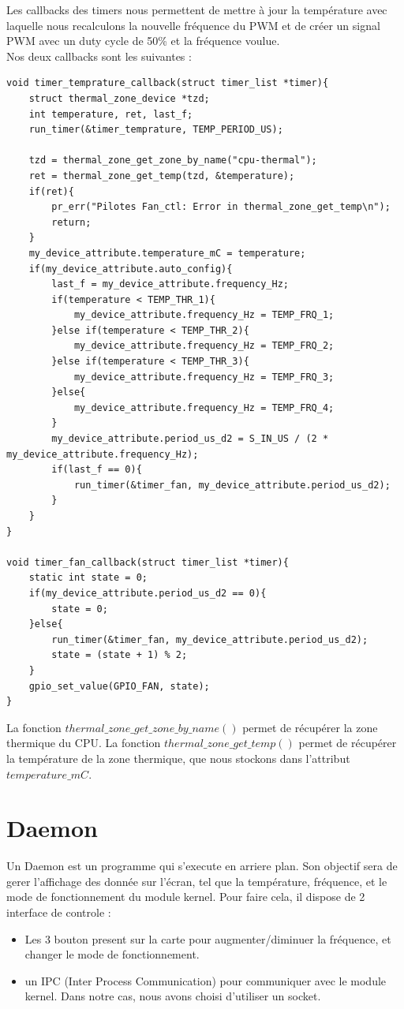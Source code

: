 \documentclass[
	a4paper, %
	10pt, %
]{CSUniSchoolLabReport}
\begin{document}
Les callbacks des timers nous permettent de mettre à jour la température avec laquelle nous recalculons la nouvelle fréquence du PWM et de créer un signal PWM avec un duty cycle de 50\% et la fréquence voulue. \\
Nos deux callbacks sont les suivantes :
\begin{lstlisting}[style=CStyle]
void timer_temprature_callback(struct timer_list *timer){
	struct thermal_zone_device *tzd;
	int temperature, ret, last_f;
	run_timer(&timer_temprature, TEMP_PERIOD_US);

	tzd = thermal_zone_get_zone_by_name("cpu-thermal");
	ret = thermal_zone_get_temp(tzd, &temperature);
	if(ret){
		pr_err("Pilotes Fan_ctl: Error in thermal_zone_get_temp\n");
		return;
	}
	my_device_attribute.temperature_mC = temperature;
	if(my_device_attribute.auto_config){
		last_f = my_device_attribute.frequency_Hz;
		if(temperature < TEMP_THR_1){
			my_device_attribute.frequency_Hz = TEMP_FRQ_1;
		}else if(temperature < TEMP_THR_2){
			my_device_attribute.frequency_Hz = TEMP_FRQ_2;
		}else if(temperature < TEMP_THR_3){
			my_device_attribute.frequency_Hz = TEMP_FRQ_3;
		}else{
			my_device_attribute.frequency_Hz = TEMP_FRQ_4;
		}
		my_device_attribute.period_us_d2 = S_IN_US / (2 * my_device_attribute.frequency_Hz);
		if(last_f == 0){
			run_timer(&timer_fan, my_device_attribute.period_us_d2);
		}
	}
}

void timer_fan_callback(struct timer_list *timer){
	static int state = 0;
	if(my_device_attribute.period_us_d2 == 0){
		state = 0;
	}else{
		run_timer(&timer_fan, my_device_attribute.period_us_d2);
		state = (state + 1) % 2;
	}
	gpio_set_value(GPIO_FAN, state);
}
\end{lstlisting}

La fonction $thermal\_zone\_get\_zone\_by\_name()$ permet de récupérer la zone thermique du CPU. La fonction $thermal\_zone\_get\_temp()$ permet de récupérer la température de la zone thermique, que nous stockons dans l'attribut $temperature\_mC$. \\

\section{Daemon}\label{Daemon}
Un Daemon est un programme qui s'execute en arriere plan. 
Son objectif sera de gerer l'affichage des donnée sur l'écran, tel que la température, fréquence, et le mode de fonctionnement du module kernel.
Pour faire cela, il dispose de 2 interface de controle : \\
\begin{itemize}
	\item Les 3 bouton present sur la carte pour augmenter/diminuer la fréquence, et changer le mode de fonctionnement.
	\item un IPC (Inter Process Communication) pour communiquer avec le module kernel. Dans notre cas, nous avons choisi d'utiliser un socket.
\end{itemize}
\end{document}
